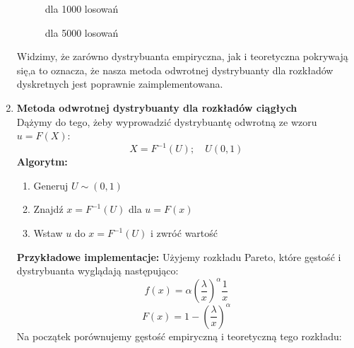\documentclass{article}
\begin{document}
\begin{enumerate}
\begin{figure}[h]
\begin{center}
{				}
				\caption{dla 1000 losowań}
				\caption{dla 5000 losowań}
			\end{center}
		\end{figure}
		
		Widzimy, że zarówno dystrybuanta empiryczna, jak i teoretyczna pokrywają się,a to oznacza, że nasza metoda odwrotnej dystrybuanty dla rozkładów dyskretnych jest poprawnie zaimplementowana.
		
		\item \textbf{Metoda odwrotnej dystrybuanty dla rozkładów ciągłych}\\
		
		Dążymy do tego, żeby wyprowadzić dystrybuantę odwrotną ze wzoru $u = F(X)$:
		$$X = F^{-1}(U);\hspace{1em} U(0,1)$$ 
		\textbf{Algorytm:}
		\begin{enumerate}
			\item Generuj $U\sim (0,1)$
			\item Znajdź $x = F^{-1}(U)$ dla $u = F(x)$
			\item 
			Wstaw $u$ do $x = F^{-1}(U)$ i zwróć wartość
		\end{enumerate}
		\textbf{Przykładowe implementacje:}
		Użyjemy rozkładu Pareto, które gęstość i dystrybuanta wyglądają następująco:
		$$f(x) = \alpha(\frac{\lambda}{x})^\alpha\frac{1}{x}$$
		$$ F(x) = 1 - (\frac{\lambda}{x})^\alpha$$
		Na początek porównujemy gęstość empiryczną i teoretyczną tego rozkładu:
		\begin{figure}[h]
			\begin{center}
\end{center}
\end{figure}
\end{enumerate}
\end{document}
